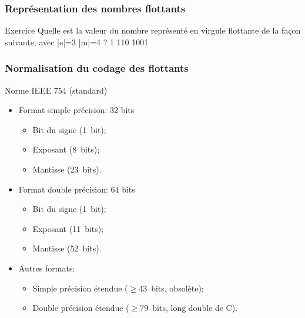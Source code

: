 \documentclass{beamer}
\begin{document}
  \begin{frame}
	\frametitle{Représentation des nombres flottants}
	\begin{block}{Exercice}
		Quelle est la valeur du nombre représenté en virgule flottante
		de la façon suivante, avec |e|=3 |m|=4 ?  1 110 1001
	\end{block}
\end{frame}

\begin{frame}
	\frametitle{Normalisation du codage des flottants}
	
	\begin{block}{Norme IEEE 754 (standard)}
		\begin{itemize}
			\item Format simple précision: 32 bits
			\begin{itemize}
				\item Bit du signe (1~bit);
				\item Exposant (8~bits);
				\item Mantisse (23~bits).
			\end{itemize}
			
			\item Format double précision: 64 bits
			\begin{itemize}
				\item Bit du signe (1~bit);
				\item Exposant (11~bits);
				\item Mantisse (52~bits).
			\end{itemize}
			
			\item Autres formats:
			\begin{itemize}
				\item Simple précision étendue ($\geq{}43$~bits, obsolète);
				\item Double précision étendue ($\geq{}79$~bits, long double de C).
			\end{itemize}
		\end{itemize}
	\end{block}
\end{frame}
\end{document}
